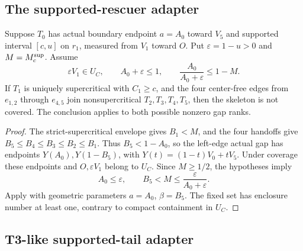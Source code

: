 



\subsection{The supported-rescuer adapter}



\begin{lemma}
\label{lem:new-rescuer-tail-budget}
Suppose $T_0$ has actual boundary endpoint $a=A_0$ toward $V_5$ and
supported interval $[c,u]$ on $r_1$, measured from $V_1$ toward $O$.
Put $\varepsilon=1-u>0$ and $M=M_c^{\rm sup}$. Assume
\[
 \varepsilon V_1\in U_C,\qquad A_0+\varepsilon\le1,
 \qquad \frac{A_0}{A_0+\varepsilon}\le1-M.
\]
If $T_1$ is uniquely supercritical with $C_1\ge c$, and the
four center-free edges from $e_{1,2}$ through $e_{4,5}$ join nonsupercritical
$T_2,T_3,T_4,T_5$, then the skeleton is not covered. The conclusion applies
to both possible nonzero gap ranks.
\end{lemma}
\begin{proof}
The strict-supercritical envelope gives $B_1<M$, and the four handoffs give
$B_5\le B_4\le B_3\le B_2\le B_1$. Thus $B_5<1-A_0$, so the left-edge
actual gap has endpoints $Y(A_0),Y(1-B_5)$, with $Y(t)=(1-t)V_0+tV_5$.
Under coverage these endpoints and $O,\varepsilon V_1$ belong to $U_C$.
Since $M\ge1/2$, the hypotheses imply
\[
 A_0\le\varepsilon,\qquad
 B_5<M\le\frac{\varepsilon}{A_0+\varepsilon}.
\]
Apply  with geometric parameters
$a=A_0$, $\beta=B_5$. The fixed set has enclosure number at least one,
contrary to compact containment in $U_C$.
\end{proof}

\subsection{T3-like supported-tail adapter}


